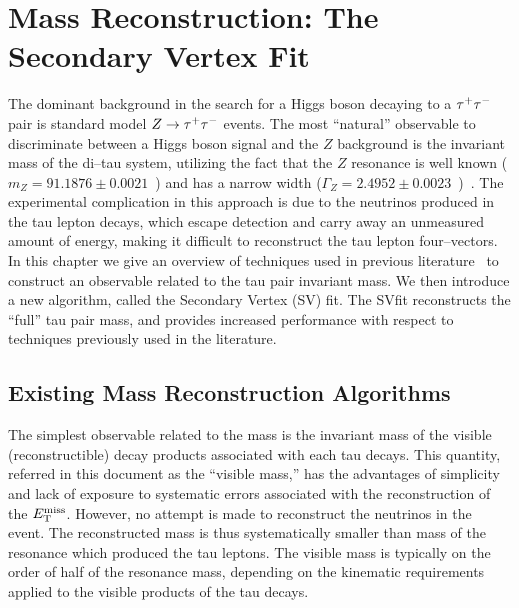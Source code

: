 \ifx\master\undefined\fi
%
\newcommand{\mtau}{m_{\tau}} \newcommand{\mnus}{m_{\nu\nu}}
\newcommand{\mvis}{m_{vis}}
%
\chapter{Mass Reconstruction: The Secondary Vertex Fit} \label{ch:svfit}
%
The dominant background in the search for a Higgs boson decaying to a $\tau^+\tau^-$ pair
is standard model $\mbox{\ensuremath{Z\to\tau^+\tau^-}}$ events.  The most ``natural'' observable to
discriminate between a Higgs boson signal and the $Z$ background is the
invariant mass of the di--tau system, utilizing the fact that the $Z$ resonance
is well known ($m_{Z} = 91.1876 \pm 0.0021$~\GeVcc) and has a narrow width
($\Gamma_{Z} = 2.4952 \pm 0.0023$~\GeV)~\cite{PDG}.  The experimental
complication in this approach is due to the neutrinos produced in the tau lepton
decays, which escape detection and carry away an unmeasured amount of energy,
making it difficult to reconstruct the tau lepton four--vectors.  In this
chapter we give an overview of techniques used in previous
literature~\cite{Rainwater:1998kj,CDFMSSMHiggs, CMS-PTDRII} to construct an
observable related to the tau pair invariant mass.  We then introduce a new algorithm,
called the Secondary Vertex (SV) fit.  The SVfit reconstructs the ``full'' tau
pair mass, and provides increased performance with respect to techniques
previously used in the literature.
%
\section{Existing Mass Reconstruction Algorithms}
%
The simplest observable related to the \TT mass is the invariant mass of the
visible (reconstructible) decay products associated with each tau decays.  This
quantity, referred in this document as the ``visible mass,'' has the advantages
of simplicity and lack of exposure to systematic errors associated with the
reconstruction of the $E_{\mathrm{T}}^{\text{miss}}$.  However, no attempt is made to reconstruct the
neutrinos in the event.  The reconstructed mass is thus systematically smaller
than mass of the resonance which produced the tau leptons.  The visible mass is
typically on the order of half of the resonance mass, depending on the
kinematic requirements applied to the visible products of the tau decays. 

